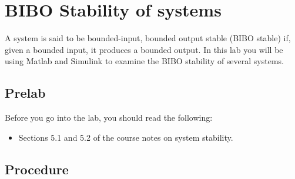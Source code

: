 \chapter{BIBO Stability of systems}\label{chap:stability}

A system is said to be bounded-input, bounded output stable (BIBO stable) if,
given a bounded input, it produces a bounded output. In this lab you will be
using \textsf{Matlab} and \textsf{Simulink} to examine the BIBO stability of
several systems.

\section{Prelab}

Before you go into the lab, you should read the following:
\begin{itemize}
    \item Sections 5.1 and 5.2 of the course notes on
          system stability.
\end{itemize}

\section{Procedure}

